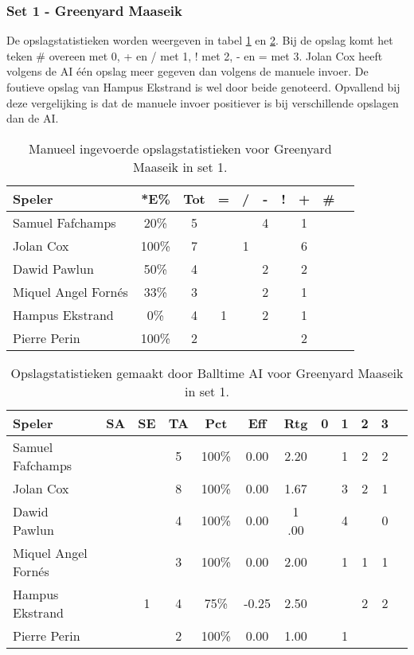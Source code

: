 \subsubsection{Set 1 - Greenyard Maaseik}
\label{sec:PL3_Greenyard1}

De opslagstatistieken worden weergeven in tabel \ref{tab:PL3ServeMaaseikMan1} en \ref{tab:PL3ServeMaaseikAI1}. Bij de opslag komt het teken \# overeen met 0, + en / met 1, ! met 2, - en = met 3.
Jolan Cox heeft volgens de AI één opslag meer gegeven dan volgens de manuele invoer. De foutieve opslag van Hampus Ekstrand is wel door beide genoteerd. Opvallend bij deze vergelijking is dat de manuele invoer positiever is bij verschillende opslagen dan de AI.

\begin{table}[ht!]
    \centering
    \scriptsize
    \begin{tabular}{|l|c|c|c|c|c|c|c|c|c|} \hline
        \textbf{Speler} & *E\% & Tot & = & / & - & ! & + & \# \\ \hline
        Samuel Fafchamps & 20\% & 5 &  & & 4 &  & 1 &  \\ 
        Jolan Cox & 100\% & 7 &  & 1 &  & & 6 &  \\ 
        Dawid Pawlun & 50\% & 4 &  &  & 2 & & 2 &  \\
        Miquel Angel Fornés & 33\% & 3 &  & & 2 &  & 1 &  \\
        Hampus Ekstrand & 0\% & 4 & 1 &  & 2 &  & 1 & \\ 
        Pierre Perin & 100\% & 2 &  &  &  & & 2 &  \\ \hline
    \end{tabular}
    \caption[Manueel ingevoerde opslagstatistieken voor Greenyard Maaseik in set 1]{\label{tab:PL3ServeMaaseikMan1}Manueel ingevoerde opslagstatistieken voor Greenyard Maaseik in set 1.}
\end{table}

\begin{table}[ht!]
  \centering
  \scriptsize
  \begin{tabular}{|l|c|c|c|c|c|c|c|c|c|c|c|} \hline
    \textbf{Speler} & SA & SE & TA & Pct & Eff & Rtg & 0 & 1 & 2 & 3 \\ \hline
    Samuel Fafchamps &  &  & 5 & 100\% & 0.00 & 2.20 &   & 1 & 2 & 2 \\
    Jolan Cox &  &  & 8 & 100\% & 0.00 & 1.67 &   & 3 & 2 & 1 \\
    Dawid Pawlun &  &  & 4 & 100\% & 0.00 & 1 .00 &   & 4 &  & 0 \\
    Miquel Angel Fornés &  &  & 3 & 100\% & 0.00 & 2.00 &  & 1 & 1 & 1 \\
    Hampus Ekstrand &  & 1 & 4 & 75\% & -0.25 & 2.50 &   & & 2 & 2 \\
    Pierre Perin & & & 2 & 100\% & 0.00 & 1.00 &   & 1 &   &  \\  \hline
  \end{tabular}
  \caption[Opslagstatistieken gemaakt door Balltime AI voor Greenyard Maaseik in set 1]{\label{tab:PL3ServeMaaseikAI1}Opslagstatistieken gemaakt door Balltime AI voor Greenyard Maaseik in set 1.}
\end{table}

